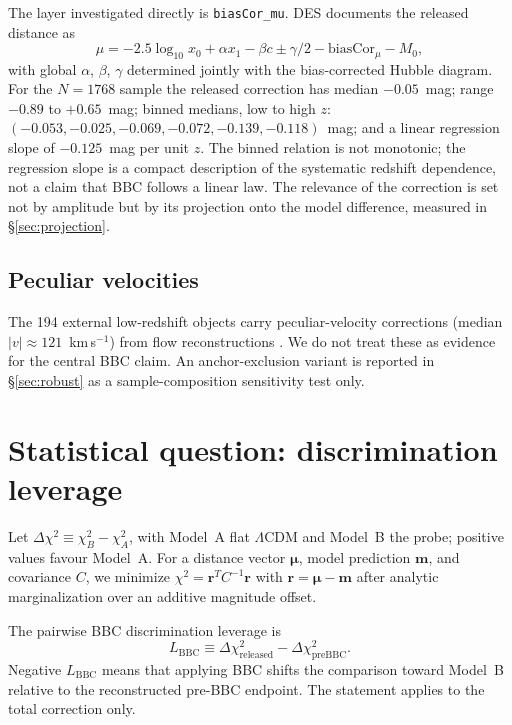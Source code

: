 \documentclass[11pt]{article}
\begin{document}
The layer investigated directly is \texttt{biasCor\_mu}. DES documents the
released distance as
\begin{equation}
\mu = -2.5\log_{10} x_0 + \alpha x_1 - \beta c \pm \gamma/2
      - \mathrm{biasCor}_\mu - M_0 ,
\label{eq:mudef}
\end{equation}
with global $\alpha$, $\beta$, $\gamma$ determined jointly with the
bias-corrected Hubble diagram. For the $N = 1768$ sample the released
correction has median $-0.05$~mag; range $-0.89$ to $+0.65$~mag; binned
medians, low to high $z$:
$(-0.053, -0.025, -0.069, -0.072, -0.139, -0.118)$~mag; and a linear
regression slope of $-0.125$~mag per unit $z$. The binned relation is not
monotonic; the regression slope is a compact description of the systematic
redshift dependence, not a claim that BBC follows a linear law. The
relevance of the correction is set not by amplitude but by its projection
onto the model difference, measured in \S\ref{sec:projection}.

\subsection{Peculiar velocities}

The 194 external low-redshift objects carry peculiar-velocity corrections
(median $|v| \approx 121$~km\,s$^{-1}$) from flow reconstructions
\citep{Peterson2022}. We do not treat these as evidence for the central
BBC claim. An anchor-exclusion variant is reported in \S\ref{sec:robust}
as a sample-composition sensitivity test only.

\section{Statistical question: discrimination leverage}
\label{sec:stat}

Let $\Delta\chi^2 \equiv \chi^2_B - \chi^2_A$, with Model~A flat
$\Lambda$CDM and Model~B the probe; positive values favour Model~A. For a
distance vector $\boldsymbol{\mu}$, model prediction $\boldsymbol{m}$, and
covariance $C$, we minimize
$\chi^2 = \boldsymbol{r}^{T} C^{-1} \boldsymbol{r}$ with
$\boldsymbol{r} = \boldsymbol{\mu} - \boldsymbol{m}$ after analytic
marginalization over an additive magnitude offset.

The pairwise BBC discrimination leverage is
\begin{equation}
L_{\mathrm{BBC}}
\equiv
\Delta\chi^2_{\mathrm{released}}
-
\Delta\chi^2_{\mathrm{preBBC}} .
\label{eq:lbbc}
\end{equation}
Negative $L_{\mathrm{BBC}}$ means that applying BBC shifts the comparison
toward Model~B relative to the reconstructed pre-BBC endpoint. The
statement applies to the total correction only.
\end{document}
